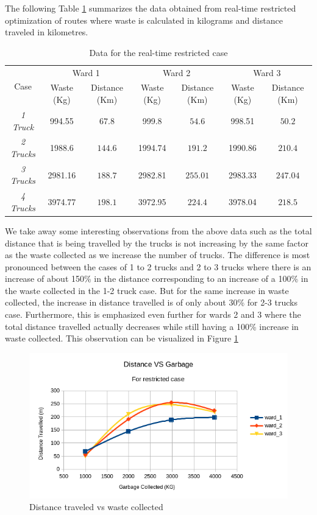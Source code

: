\documentclass[12pt]{article}
\begin{document}
The following Table \ref{tab1} summarizes the data obtained from real-time restricted optimization of routes where waste is calculated in kilograms and distance traveled in kilometres.
\begin{table}[H]
    \centering
    \caption{Data for the real-time restricted case} \label{tab1}
    \vspace*{0.3cm}
    \begin{tabular}{|c|c|c|c|c|c|c|}
        \hline \multirow{2}{*}{Case} & \multicolumn{2}{c|}{Ward 1} & \multicolumn{2}{c|}{Ward 2} & \multicolumn{2}{c|}{Ward 3}\\
        \cline{2-7}& Waste (Kg)  & Distance (Km) & Waste (Kg) & Distance (Km) & Waste (Kg) & Distance (Km)\\ 
        \hline \textit{1 Truck} & 994.55 & $67.8$ & 999.8 & $54.6$ & 998.51 & $50.2$ \\
        \hline \textit{2 Trucks} & 1988.6 & $144.6$ & 1994.74 & $191.2$ & 1990.86 & $210.4$ \\
        \hline \textit{3 Trucks} & 2981.16 & $188.7$ & 2982.81 & $255.01$ & 2983.33 & $247.04$ \\
        \hline \textit{4 Trucks} & 3974.77 & $198.1$ & 3972.95 & $224.4$ & 3978.04 & $218.5$ \\
        \hline
    \end{tabular}
\end{table}
We take away some interesting observations from the above data such as the total distance that is being travelled by the trucks is not increasing by the same factor as the waste collected as we increase the number of trucks. The difference is most pronounced between the cases of 1 to 2 trucks and 2 to 3 trucks where there is an increase of about 150\% in the distance corresponding to an increase of a 100\% in the waste collected in the 1-2 truck case. But for the same increase in waste collected, the increase in distance travelled is of only about 30\% for 2-3 trucks case. Furthermore, this is emphasized even further for wards 2 and 3 where the total distance travelled actually decreases while still having a 100\% increase in waste collected. This observation can be visualized in Figure \ref{figz}
\begin{figure}[H]
    \centering
    \includegraphics[scale=0.8]{distance_VS_garbage_restricted.png}
    \caption{Distance traveled vs waste collected}\label{figz}
\end{figure}
\end{document}

